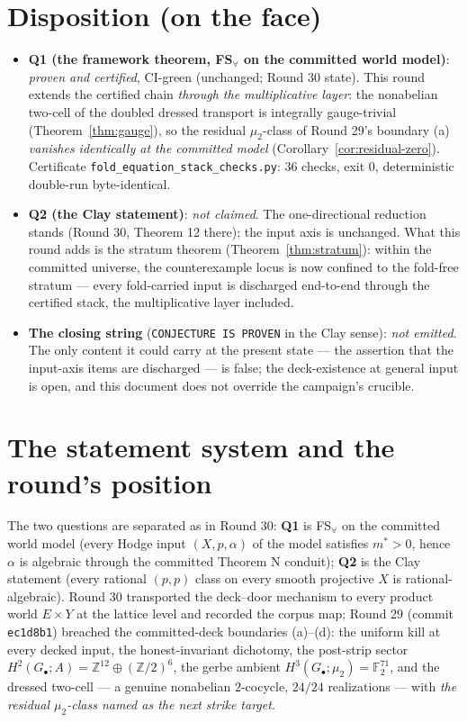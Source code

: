 \documentclass[11pt]{article}
\newcommand{\Z}{\mathbb Z}
\newcommand{\F}{\mathbb F}
\begin{document}
\tableofcontents
\bigskip

\section*{Disposition (on the face)}

\begin{itemize}
\item \textbf{Q1 (the framework theorem, FS$_\forall$ on the committed
world model)}: \emph{proven and certified}, CI-green (unchanged;
Round 30 state). This round extends the certified chain \emph{through
the multiplicative layer}: the nonabelian two-cell of the doubled
dressed transport is integrally gauge-trivial
(Theorem~\ref{thm:gauge}), so the residual $\mu_2$-class
of Round 29's boundary (a) \emph{vanishes identically at the committed
model} (Corollary~\ref{cor:residual-zero}). Certificate
\texttt{fold\_equation\_stack\_checks.py}: 36 checks, exit 0,
deterministic double-run byte-identical.
\item \textbf{Q2 (the Clay statement)}: \emph{not claimed}. The
one-directional reduction stands (Round 30, Theorem 12 there); the
input axis is unchanged. What this round adds is the stratum theorem
(Theorem~\ref{thm:stratum}): within the committed universe, the
counterexample locus is now confined to the fold-free stratum --- every
fold-carried input is discharged end-to-end through the certified
stack, the multiplicative layer included.
\item \textbf{The closing string} (\texttt{CONJECTURE IS PROVEN} in the
Clay sense): \emph{not emitted}. The only content it could carry at
the present state --- the assertion that the input-axis items are
discharged --- is false; the deck-existence at general input is open,
and this document does not override the campaign's crucible.
\end{itemize}

\section{The statement system and the round's position}\label{sec:position}

The two questions are separated as in Round 30: \textbf{Q1} is
FS$_\forall$ on the committed world model (every Hodge input
$(X,p,\alpha)$ of the model satisfies $m^\ast>0$, hence $\alpha$ is
algebraic through the committed Theorem N conduit);
\textbf{Q2} is the Clay statement (every rational $(p,p)$ class on
every smooth projective $X$ is rational-algebraic). Round 30
transported the deck--door mechanism to every product world $E\times Y$
at the lattice level and recorded the corpus map; Round 29
(commit \texttt{ec1d8b1}) breached the committed-deck boundaries
(a)--(d): the uniform kill at every decked input, the honest-invariant
dichotomy, the post-strip sector $H^2(G_\bullet;A)=\Z^{12}\oplus(\Z/2)^6$,
the gerbe ambient $H^3(G_\bullet;\mu_2)=\F_2^{71}$, and the dressed
two-cell --- a genuine nonabelian $2$-cocycle, $24/24$ realizations ---
with \emph{the residual $\mu_2$-class named as the next strike target}.
\end{document}
